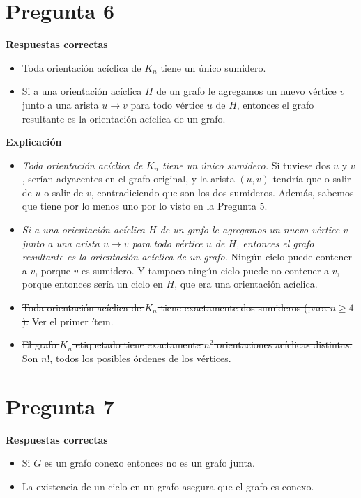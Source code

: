 \documentclass{article}
\begin{document}
\section*{Pregunta 6}
\textbf{Respuestas correctas}

\begin{itemize}
    \item Toda orientación acíclica de $K_n$ tiene un único sumidero.
    \item Si a una orientación acíclica $H$ de un grafo le agregamos un nuevo vértice $v$ junto a una arista $u \rightarrow v$ para todo vértice $u$ de $H$, entonces el grafo resultante es la orientación acíclica de un grafo.
\end{itemize}

\textbf{Explicación}

\begin{itemize}
    \item \textit{Toda orientación acíclica de $K_n$ tiene un único sumidero.} Si tuviese dos $u$ y $v$, serían adyacentes en el grafo original, y la arista $(u, v)$ tendría que o salir de $u$ o salir de $v$, contradiciendo que son los dos sumideros. Además, sabemos que tiene por lo menos uno por lo visto en la Pregunta 5.
    \item \textit{Si a una orientación acíclica $H$ de un grafo le agregamos un nuevo vértice $v$ junto a una arista $u \rightarrow v$ para todo vértice $u$ de $H$, entonces el grafo resultante es la orientación acíclica de un grafo.} Ningún ciclo puede contener a $v$, porque $v$ es sumidero. Y tampoco ningún ciclo puede no contener a $v$, porque entonces sería un ciclo en $H$, que era una orientación acíclica.
    \item \sout{Toda orientación acíclica de $K_n$ tiene exactamente dos sumideros (para $n \geq 4$).} Ver el primer ítem.
    \item \sout{El grafo $K_n$ etiquetado tiene exactamente $n^2$ orientaciones acíclicas distintas.} Son $n!$, todos los posibles órdenes de los vértices.
\end{itemize}

\section*{Pregunta 7}
\textbf{Respuestas correctas}

\begin{itemize}
    \item Si $G$ es un grafo conexo entonces no es un grafo junta.
    \item La existencia de un ciclo en un grafo asegura que el grafo es conexo.
\end{itemize}
\end{document}
